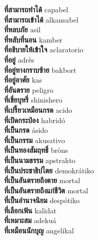 \textbf{ ที่สามารถทำได้  } capabel \\
\textbf{ ที่สามารถเข้าได้  } alkansabel \\
\textbf{ ที่หลบภัย  } asil \\
\textbf{ ที่หลับที่นอน  } kamber \\
\textbf{ ที่อธิบายให้เข้าใจ  } aclaratorio \\
\textbf{ ที่อยู่  } adrès \\
\textbf{ ที่อยู่ทางกราบซ้าย  } bakbort \\
\textbf{ ที่อยู่อาศัย  } kas \\
\textbf{ ที่อันตราย  } peligro \\
\textbf{ ที่เขี่ยบุหรี่  } shinishero \\
\textbf{ ที่เปรี้ยวเหมือนกรด  } acido \\
\textbf{ ที่เปิดกระป๋อง  } habridó \\
\textbf{ ที่เป็นกรด  } ásido \\
\textbf{ ที่เป็นกรรม  } akusativo \\
\textbf{ ที่เป็นทองสัมฤทธิ์  } bròns \\
\textbf{ ที่เป็นนามธรรม  } apstrakto \\
\textbf{ ที่เป็นประชาธิปไตย  } demokrátiko \\
\textbf{ ที่เป็นอันตรายถึงตาย  } mortal \\
\textbf{ ที่เป็นอันตรายถึงแก่ชีวิต  } mortal \\
\textbf{ ที่เป็นอำนาจนิยม  } despótiko \\
\textbf{ ที่เลือกเฟ้น  } kalidat \\
\textbf{ ที่เหมาะสม  } adekuá \\
\textbf{ ที่เหมือนนักบุญ  } angelikal \\

